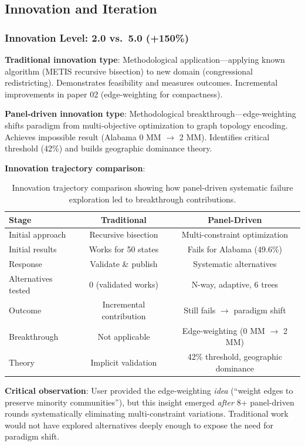 \subsection{Innovation and Iteration}

\subsubsection{Innovation Level: 2.0 vs.\ 5.0 (+150\%)}

\textbf{Traditional innovation type}: Methodological application---applying known algorithm (METIS recursive bisection) to new domain (congressional redistricting). Demonstrates feasibility and measures outcomes. Incremental improvements in paper 02 (edge-weighting for compactness).

\textbf{Panel-driven innovation type}: Methodological breakthrough---edge-weighting shifts paradigm from multi-objective optimization to graph topology encoding. Achieves impossible result (Alabama 0 MM $\to$ 2 MM). Identifies critical threshold (42\%) and builds geographic dominance theory.

\textbf{Innovation trajectory comparison}:

\begin{table}[h]
\centering
\small
\begin{tabular}{lcc}
\toprule
\textbf{Stage} & \textbf{Traditional} & \textbf{Panel-Driven} \\
\midrule
Initial approach & Recursive bisection & Multi-constraint optimization \\
Initial results & Works for 50 states & Fails for Alabama (49.6\%) \\
Response & Validate \& publish & Systematic alternatives \\
Alternatives tested & 0 (validated works) & N-way, adaptive, 6 trees \\
Outcome & Incremental contribution & Still fails $\to$ paradigm shift \\
Breakthrough & Not applicable & Edge-weighting (0 MM $\to$ 2 MM) \\
Theory & Implicit validation & 42\% threshold, geographic dominance \\
\bottomrule
\end{tabular}
\caption{Innovation trajectory comparison showing how panel-driven systematic failure exploration led to breakthrough contributions.}
\label{tab:innovation}
\end{table}

\textbf{Critical observation}: User provided the edge-weighting \emph{idea} (``weight edges to preserve minority communities''), but this insight emerged \emph{after} 8+ panel-driven rounds systematically eliminating multi-constraint variations. Traditional work would not have explored alternatives deeply enough to expose the need for paradigm shift.

